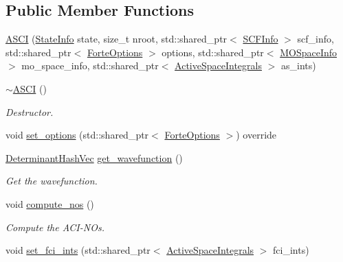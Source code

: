 \subsection*{Public Member Functions}
\begin{DoxyCompactItemize}
\item 
\mbox{\hyperlink{classforte_1_1_a_s_c_i_a3640cec78b82f59f8afe187b94900f7d}{A\+S\+CI}} (\mbox{\hyperlink{classforte_1_1_state_info}{State\+Info}} state, size\+\_\+t nroot, std\+::shared\+\_\+ptr$<$ \mbox{\hyperlink{classforte_1_1_s_c_f_info}{S\+C\+F\+Info}} $>$ scf\+\_\+info, std\+::shared\+\_\+ptr$<$ \mbox{\hyperlink{classforte_1_1_forte_options}{Forte\+Options}} $>$ options, std\+::shared\+\_\+ptr$<$ \mbox{\hyperlink{classforte_1_1_m_o_space_info}{M\+O\+Space\+Info}} $>$ mo\+\_\+space\+\_\+info, std\+::shared\+\_\+ptr$<$ \mbox{\hyperlink{classforte_1_1_active_space_integrals}{Active\+Space\+Integrals}} $>$ as\+\_\+ints)
\item 
\mbox{\hyperlink{classforte_1_1_a_s_c_i_ababa5808cb2d4d19ef4cac29eae4657c}{$\sim$\+A\+S\+CI}} ()
\begin{DoxyCompactList}\small\item\em Destructor. \end{DoxyCompactList}\item 
void \mbox{\hyperlink{classforte_1_1_a_s_c_i_a7b219391b694de5192f5a467f64f60c4}{set\+\_\+options}} (std\+::shared\+\_\+ptr$<$ \mbox{\hyperlink{classforte_1_1_forte_options}{Forte\+Options}} $>$) override
\item 
\mbox{\hyperlink{classforte_1_1_determinant_hash_vec}{Determinant\+Hash\+Vec}} \mbox{\hyperlink{classforte_1_1_a_s_c_i_a1d1cb0632d2a03f39b421c2628e784fe}{get\+\_\+wavefunction}} ()
\begin{DoxyCompactList}\small\item\em Get the wavefunction. \end{DoxyCompactList}\item 
void \mbox{\hyperlink{classforte_1_1_a_s_c_i_a4a6bbf34863155aa72e7a3128a3fbe00}{compute\+\_\+nos}} ()
\begin{DoxyCompactList}\small\item\em Compute the A\+C\+I-\/\+N\+Os. \end{DoxyCompactList}\item 
void \mbox{\hyperlink{classforte_1_1_a_s_c_i_a59c39bbad1264f8daa3dadb0eeccdbd7}{set\+\_\+fci\+\_\+ints}} (std\+::shared\+\_\+ptr$<$ \mbox{\hyperlink{classforte_1_1_active_space_integrals}{Active\+Space\+Integrals}} $>$ fci\+\_\+ints)
\item 

\end{DoxyCompactItemize}
